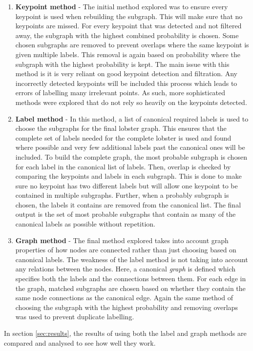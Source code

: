 \begin{enumerate}
\item \textbf{Keypoint method} - The initial method explored was to ensure every keypoint is used when rebuilding the subgraph. This will make sure that no keypoints are missed. For every keypoint that was detected and not filtered away, the subgraph with the highest combined probability is chosen. Some chosen subgraphs are removed to prevent overlaps where the same keypoint is given multiple labels. This removal is again based on probability where the subgraph with the highest probability is kept. The main issue with this method is it is very reliant on good keypoint detection and filtration. Any incorrectly detected keypoints will be included this process which leads to errors of labelling many irrelevant points. As such, more sophisticated methods were explored that do not rely so heavily on the keypoints detected.
\item \textbf{Label method} - In this method, a list of canonical required labels is used to choose the subgraphs for the final lobster graph. This ensures that the complete set of labels needed for the complete lobster is used and found where possible and very few additional labels past the canonical ones will be included. To build the complete graph, the most probable subgraph is chosen for each label in the canonical list of labels. Then, overlap is checked by comparing the keypoints and labels in each subgraph. This is done to make sure no keypoint has two different labels but will allow one keypoint to be contained in multiple subgraphs. Further, when a probably subgraph is chosen, the labels it contains are removed from the canonical list. The final output is the set of most probable subgraphs that contain as many of the canonical labels as possible without repetition. 
\item \textbf{Graph method} - The final method explored takes into account graph properties of how nodes are connected rather than just choosing based on canonical labels. The weakness of the label method is not taking into account any relations between the nodes. Here, a canonical \textit{graph} is defined which specifies both the labels and the connections between them. For each edge in the graph, matched subgraphs are chosen based on whether they contain the same node connections as the canonical edge. Again the same method of choosing the subgraph with the highest probability and removing overlaps was used to prevent duplicate labelling.
\end{enumerate}
\noindent
In section \ref{sec:results}, the results of using both the label and graph methods are compared and analysed to see how well they work.


